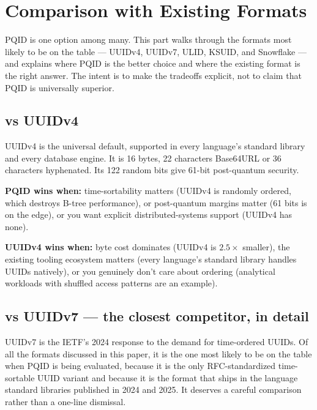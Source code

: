 \section{Comparison with Existing Formats}
\label{sec:compare}

PQID is one option among many. This part walks through the formats most likely to be on the table --- UUIDv4, UUIDv7, ULID, KSUID, and Snowflake --- and explains where PQID is the better choice and where the existing format is the right answer. The intent is to make the tradeoffs explicit, not to claim that PQID is universally superior.

\subsection{vs UUIDv4 \citep{rfc4122}}

UUIDv4 is the universal default, supported in every language's standard library and every database engine. It is 16 bytes, 22 characters Base64URL or 36 characters hyphenated. Its 122 random bits give 61-bit post-quantum security.

\textbf{PQID wins when:} time-sortability matters (UUIDv4 is randomly ordered, which destroys B-tree performance), or post-quantum margins matter (61 bits is on the edge), or you want explicit distributed-systems support (UUIDv4 has none).

\textbf{UUIDv4 wins when:} byte cost dominates (UUIDv4 is $2.5\times$ smaller), the existing tooling ecosystem matters (every language's standard library handles UUIDs natively), or you genuinely don't care about ordering (analytical workloads with shuffled access patterns are an example).

\subsection{vs UUIDv7 \citep{rfc9562} --- the closest competitor, in detail}

UUIDv7 is the IETF's 2024 response to the demand for time-ordered UUIDs. Of all the formats discussed in this paper, it is the one most likely to be on the table when PQID is being evaluated, because it is the only RFC-standardized time-sortable UUID variant and because it is the format that ships in the language standard libraries published in 2024 and 2025. It deserves a careful comparison rather than a one-line dismissal.

